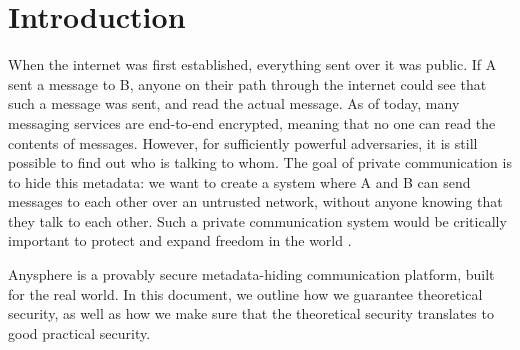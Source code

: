 \section{Introduction}

When the internet was first established, everything sent over it was public. If A sent a message to B, anyone on their path through the internet could see that such a message was sent, and read the actual message. As of today, many messaging services are end-to-end encrypted, meaning that no one can read the contents of messages. However, for sufficiently powerful adversaries, it is still possible to find out who is talking to whom. The goal of private communication is to hide this metadata: we want to create a system where A and B can send messages to each other over an untrusted network, without anyone knowing that they talk to each other. Such a private communication system would be critically important to protect and expand freedom in the world \cite{arvid}.

Anysphere is a provably secure metadata-hiding communication platform, built for the real world. In this document, we outline how we guarantee theoretical security, as well as how we make sure that the theoretical security translates to good practical security.
